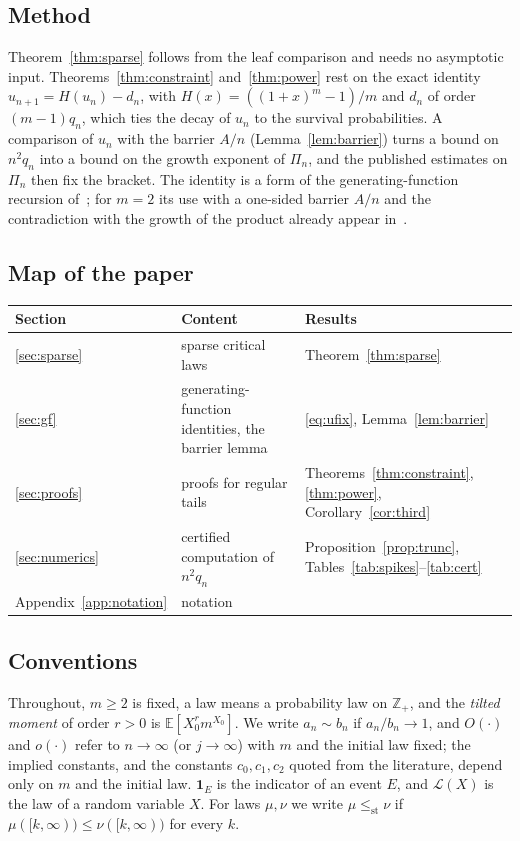 \documentclass[11pt]{amsart}
\theoremstyle{remark}
\numberwithin{equation}{section}
\newcommand{\EE}{\mathbb{E}}
\begin{document}
\subsection*{Method}
Theorem~\ref{thm:sparse} follows from the leaf comparison and needs no asymptotic input. Theorems~\ref{thm:constraint} and~\ref{thm:power} rest on the exact identity $u_{n+1}=H(u_n)-d_n$, with $H(x)=((1+x)^m-1)/m$ and $d_n$ of order $(m-1)q_n$, which ties the decay of $u_n$ to the survival probabilities. A comparison of $u_n$ with the barrier $A/n$ (Lemma~\ref{lem:barrier}) turns a bound on $n^2q_n$ into a bound on the growth exponent of $\Pi_n$, and the published estimates on $\Pi_n$ then fix the bracket. The identity is a form of the generating-function recursion of~\cite{CEGM,DR,CDHLS}; for $m=2$ its use with a one-sided barrier $A/n$ and the contradiction with the growth of the product already appear in~\cite{Sh}.

\subsection*{Map of the paper}
\begin{center}\small
\begin{tabular}{lll}
\toprule
Section & Content & Results\\
\midrule
\ref{sec:sparse} & sparse critical laws & Theorem~\ref{thm:sparse}\\
\ref{sec:gf} & generating-function identities, the barrier lemma & \eqref{eq:ufix}, Lemma~\ref{lem:barrier}\\
\ref{sec:proofs} & proofs for regular tails & Theorems~\ref{thm:constraint}, \ref{thm:power}, Corollary~\ref{cor:third}\\
\ref{sec:numerics} & certified computation of $n^2q_n$ & Proposition~\ref{prop:trunc}, Tables~\ref{tab:spikes}--\ref{tab:cert}\\
Appendix~\ref{app:notation} & notation & \\
\bottomrule
\end{tabular}
\end{center}

\subsection*{Conventions}
Throughout, $m\ge2$ is fixed, a law means a probability law on $\mathbb Z_+$, and the \emph{tilted moment} of order $r>0$ is $\EE[X_0^rm^{X_0}]$. We write $a_n\sim b_n$ if $a_n/b_n\to1$, and $O(\cdot)$ and $o(\cdot)$ refer to $n\to\infty$ (or $j\to\infty$) with $m$ and the initial law fixed; the implied constants, and the constants $c_0,c_1,c_2$ quoted from the literature, depend only on $m$ and the initial law. $\mathbf 1_E$ is the indicator of an event $E$, and $\mathcal L(X)$ is the law of a random variable $X$. For laws $\mu,\nu$ we write $\mu\le_{\mathrm{st}}\nu$ if $\mu([k,\infty))\le\nu([k,\infty))$ for every $k$.
\end{document}
